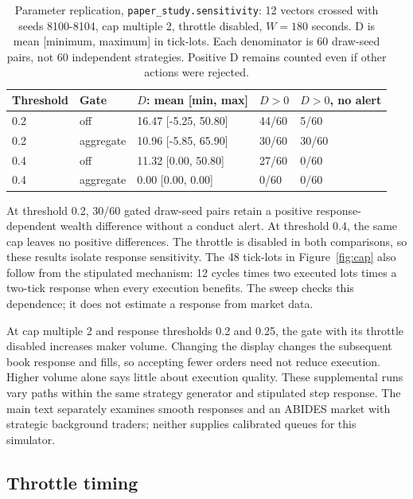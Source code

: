 \documentclass{article}
\begin{document}
\begin{table}[htbp]
\centering
\small
\begin{tabular}{lllll}
\toprule
\textbf{Threshold} & \textbf{Gate} & \textbf{$D$: mean [min, max]} & \textbf{$D > 0$} & \textbf{$D > 0$, no alert} \\
\midrule
0.2 & off & 16.47 [-5.25, 50.80] & 44/60 & 5/60 \\
0.2 & aggregate & 10.96 [-5.85, 65.90] & 30/60 & 30/60 \\
0.4 & off & 11.32 [0.00, 50.80] & 27/60 & 0/60 \\
0.4 & aggregate & 0.00 [0.00, 0.00] & 0/60 & 0/60 \\
\bottomrule
\end{tabular}
\caption{Parameter replication, \texttt{paper\_study.sensitivity}: 12 vectors crossed with seeds 8100-8104, cap multiple 2, throttle disabled, $W = 180$ seconds. D is mean [minimum, maximum] in tick-lots. Each denominator is 60 draw-seed pairs, not 60 independent strategies. Positive D remains counted even if other actions were rejected.}
\label{tab:replication}
\end{table}

At threshold 0.2, 30/60 gated draw-seed pairs retain a positive response-dependent wealth difference without a conduct alert. At threshold 0.4, the same cap leaves no positive differences. The throttle is disabled in both comparisons, so these results isolate response sensitivity. The 48 tick-lots in Figure~\ref{fig:cap} also follow from the stipulated mechanism: 12 cycles times two executed lots times a two-tick response when every execution benefits. The sweep checks this dependence; it does not estimate a response from market data.

At cap multiple 2 and response thresholds 0.2 and 0.25, the gate with its throttle disabled increases maker volume. Changing the display changes the subsequent book response and fills, so accepting fewer orders need not reduce execution. Higher volume alone says little about execution quality. These supplemental runs vary paths within the same strategy generator and stipulated step response. The main text separately examines smooth responses and an ABIDES market with strategic background traders; neither supplies calibrated queues for this simulator.

\subsection{Throttle timing}\label{sec:throttle}
\end{document}
